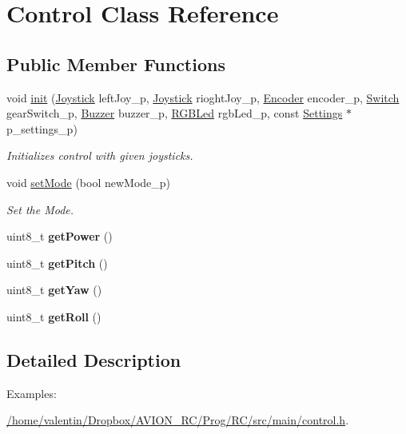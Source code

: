 \hypertarget{class_control}{}\section{Control Class Reference}
\label{class_control}
\subsection*{Public Member Functions}
\begin{DoxyCompactItemize}
\item 
void \hyperlink{class_control_a435c342eba3a2598f3eb40e68fa1a263}{init} (\hyperlink{class_joystick}{Joystick} left\+Joy\+\_\+p, \hyperlink{class_joystick}{Joystick} rioght\+Joy\+\_\+p, \hyperlink{class_encoder}{Encoder} encoder\+\_\+p, \hyperlink{class_switch}{Switch} gear\+Switch\+\_\+p, \hyperlink{class_buzzer}{Buzzer} buzzer\+\_\+p, \hyperlink{class_r_g_b_led}{R\+G\+B\+Led} rgb\+Led\+\_\+p, const \hyperlink{class_settings}{Settings} $\ast$p\+\_\+settings\+\_\+p)
\begin{DoxyCompactList}\small\item\em Initializes control with given joysticks. \end{DoxyCompactList}\item 
void \hyperlink{class_control_af7a1f77ddc2789d291e3193cfc046d50}{set\+Mode} (bool new\+Mode\+\_\+p)
\begin{DoxyCompactList}\small\item\em Set the Mode. \end{DoxyCompactList}\item 
\mbox{\label{class_control_ad131914c5deeb07146127a63010480b9}} 
uint8\+\_\+t {\bfseries get\+Power} ()
\item 
\mbox{\label{class_control_a3ebc07bf6326015a022e36eed5f431be}} 
uint8\+\_\+t {\bfseries get\+Pitch} ()
\item 
\mbox{\label{class_control_a32c3d788dfca94d73df07ef3429f222d}} 
uint8\+\_\+t {\bfseries get\+Yaw} ()
\item 
\mbox{\label{class_control_abf3709324d98b6dc8d52649af5d8df38}} 
uint8\+\_\+t {\bfseries get\+Roll} ()
\end{DoxyCompactItemize}


\subsection{Detailed Description}
\begin{Desc}
\item[Examples\+: ]\par
\hyperlink{_2home_2valentin_2_dropbox_2_a_v_i_o_n__r_c_2_prog_2_r_c_2src_2main_2control_8h-example}{/home/valentin/\+Dropbox/\+A\+V\+I\+O\+N\+\_\+\+R\+C/\+Prog/\+R\+C/src/main/control.\+h}.\end{Desc}


